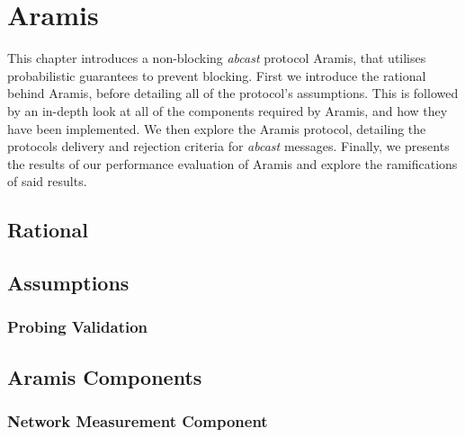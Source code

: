 \chapter{Aramis}

    \graphicspath{{Chapter4/Figs/Vector/}{Chapter4/Figs/}}

This chapter introduces a non-blocking \emph{abcast} protocol \textsf{Aramis}, that utilises probabilistic guarantees to prevent blocking.  First we introduce the rational behind \textsf{Aramis}, before detailing all of the protocol's assumptions.  This is followed by an in-depth look at all of the components required by \textsf{Aramis}, and how they have been implemented.  We then explore the \textsf{Aramis} protocol, detailing the protocols delivery and rejection criteria for \emph{abcast} messages.  Finally, we presents the results of our performance evaluation of \textsf{Aramis} and explore the ramifications of said results.    

\section{Rational}
	
\section{Assumptions}

	\subsection{Probing Validation}
	
\section{Aramis Components}
	\subsection{Network Measurement Component}

